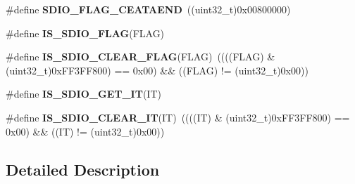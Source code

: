 \begin{DoxyCompactItemize}
\item 
\hypertarget{group___s_d_i_o___flags_ga3c8d09a405944948e7a1c5493d49aff1}{\#define {\bfseries S\-D\-I\-O\-\_\-\-F\-L\-A\-G\-\_\-\-C\-E\-A\-T\-A\-E\-N\-D}~((uint32\-\_\-t)0x00800000)}\label{group___s_d_i_o___flags_ga3c8d09a405944948e7a1c5493d49aff1}

\item 
\#define {\bfseries I\-S\-\_\-\-S\-D\-I\-O\-\_\-\-F\-L\-A\-G}(F\-L\-A\-G)
\item 
\hypertarget{group___s_d_i_o___flags_ga8a093bc0b51901676fd5da7087d8ab3a}{\#define {\bfseries I\-S\-\_\-\-S\-D\-I\-O\-\_\-\-C\-L\-E\-A\-R\-\_\-\-F\-L\-A\-G}(F\-L\-A\-G)~((((F\-L\-A\-G) \& (uint32\-\_\-t)0x\-F\-F3\-F\-F800) == 0x00) \&\& ((\-F\-L\-A\-G) != (uint32\-\_\-t)0x00))}\label{group___s_d_i_o___flags_ga8a093bc0b51901676fd5da7087d8ab3a}

\item 
\#define {\bfseries I\-S\-\_\-\-S\-D\-I\-O\-\_\-\-G\-E\-T\-\_\-\-I\-T}(I\-T)
\item 
\hypertarget{group___s_d_i_o___flags_gaf829b01d8c3e9a1e4e04d39abdc8c355}{\#define {\bfseries I\-S\-\_\-\-S\-D\-I\-O\-\_\-\-C\-L\-E\-A\-R\-\_\-\-I\-T}(I\-T)~((((I\-T) \& (uint32\-\_\-t)0x\-F\-F3\-F\-F800) == 0x00) \&\& ((\-I\-T) != (uint32\-\_\-t)0x00))}\label{group___s_d_i_o___flags_gaf829b01d8c3e9a1e4e04d39abdc8c355}

\end{DoxyCompactItemize}


\subsection{Detailed Description}


